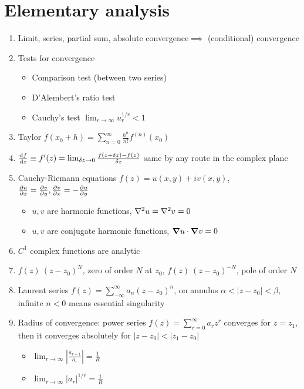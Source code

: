 \documentclass{article}
\theoremstyle{remark}
\theoremstyle{remark}
\begin{document}
    \section{Elementary analysis}
    \begin{enumerate}
        \item Limit, series, partial sum, absolute convergence$\implies$ (conditional) convergence
        \item Tests for convergence\begin{itemize}
            \item Comparison test (between two series)
            \item D'Alembert's ratio test
            \item Cauchy's test $\lim_{r\rightarrow\infty}u_r^{1/r} < 1$
        \end{itemize}
        \item Taylor $f(x_0+h)=\sum_{n=0}^{\infty}\frac{h^n}{n!}f^{(n)}(x_0)$
        \item $\dv{f}{z}\equiv f'(z)=\lim_{\delta z\rightarrow 0}\frac{f(z+\delta z)-f(z)}{\delta z}$ same by any route in the complex plane
        \item Cauchy-Riemann equations $f(z)=u(x,y)+iv(x,y)$, $\pdv{u}{x}=\pdv{v}{y}, \pdv{v}{x}=-\pdv{u}{y}$\begin{itemize}
            \item $u,v$ are harmonic functions, $\laplacian{u}=\laplacian{v}=0$
            \item $u,v$ are conjugate harmonic functions, $\grad{u}\cdot\grad{v}=0$
        \end{itemize}
        \item $C^1$ complex functions are analytic
        \item $f(z)~(z-z_0)^N$, zero of order $N$ at $z_0$, $f(z)~(z-z_0)^{-N}$, pole of order $N$
        \item Laurent series $f(z)=\sum_{-\infty}^{\infty}a_n(z-z_0)^n$, on annulus $\alpha<|z-z_0|<\beta$, infinite $n<0$ means essential singularity
        \item Radius of convergence: power series $f(z)=\sum_{r=0}^{\infty}a_r z^r$ converges for $z=z_1$, then it converges absolutely for $|z-z_0|<|z_1-z_0|$\begin{itemize}
            \item $\lim_{r\rightarrow\infty}\left|\frac{a_{r+1}}{a_r}\right| = \frac{1}{R}$
            \item $\lim_{r\rightarrow\infty}|a_r|^{1/r}=\frac{1}{R}$
        \end{itemize}
    \end{enumerate}
    
\end{document}
